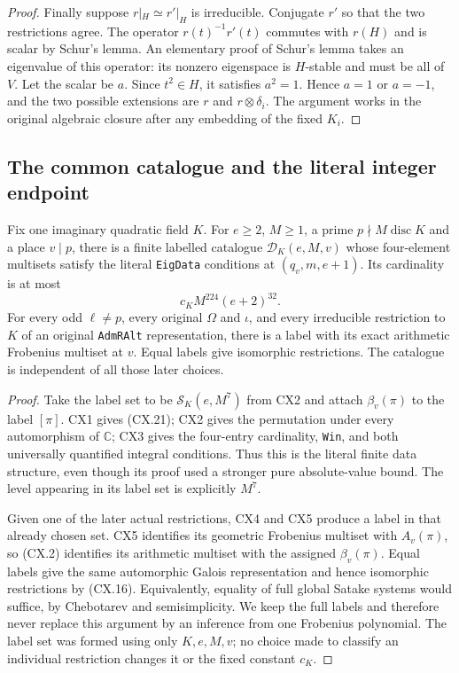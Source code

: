 \begin{proof}
Finally suppose $r|_H\simeq r'|_H$ is irreducible.  Conjugate
$r'$ so that the two restrictions agree.  The operator
$r(t)^{-1}r'(t)$ commutes with $r(H)$ and is scalar by
Schur's lemma.  An elementary proof of Schur's lemma takes
an eigenvalue of this operator: its nonzero eigenspace is
$H$-stable and must be all of $V$.  Let the scalar be $a$.
Since $t^2\in H$, it satisfies $a^2=1$.  Hence $a=1$ or
$a=-1$, and the two possible extensions are $r$ and
$r\otimes\delta_i$.  The argument works in the original
algebraic closure after any embedding of the fixed $K_i$.
\end{proof}

\subsection{The common catalogue and the literal integer endpoint}

\begin{proposition}
\label{claim:CX7}
Fix one imaginary quadratic field $K$.  For $e\ge2$, $M\ge1$,
a prime $p\nmid M\operatorname{disc}K$ and a place $v\mid p$,
there is a finite labelled catalogue $\mathcal D_K(e,M,v)$
whose four-element multisets satisfy the literal
\texttt{EigData} conditions at $(q_v,m,e+1)$.  Its cardinality
is at most
\[
                    c_K M^{224}(e+2)^{32}.                   \tag{CX.21}
\]
For every odd $\ell\ne p$, every original $\Omega$ and
$\iota$, and every irreducible restriction to $K$ of an
original \texttt{AdmRAlt} representation, there is a label
with its exact arithmetic Frobenius multiset at $v$.
Equal labels give isomorphic restrictions.  The catalogue
is independent of all those later choices.
\end{proposition}

\begin{proof}
Take the label set to be $\mathcal S_K(e,M^7)$ from CX2 and
attach $\beta_v(\pi)$ to the label $[\pi]$.  CX1 gives
(CX.21); CX2 gives the permutation under every automorphism
of $\mathbb C$; CX3 gives the four-entry cardinality,
\texttt{Win}, and both universally quantified integral
conditions.  Thus this is the literal finite data structure,
even though its proof used a stronger pure absolute-value
bound.  The level appearing in its label set is explicitly
$M^7$.

Given one of the later actual restrictions, CX4 and CX5
produce a label in that already chosen set.  CX5 identifies
its geometric Frobenius multiset with $A_v(\pi)$, so (CX.2)
identifies its arithmetic multiset with the assigned
$\beta_v(\pi)$.  Equal labels give the same automorphic
Galois representation and hence isomorphic restrictions by
(CX.16).  Equivalently, equality of full global Satake
systems would suffice, by Chebotarev and semisimplicity.
We keep the full labels and therefore never replace this
argument by an inference from one Frobenius polynomial.
The label set was formed using only $K,e,M,v$; no choice
made to classify an individual restriction changes it or
the fixed constant $c_K$.
\end{proof}

